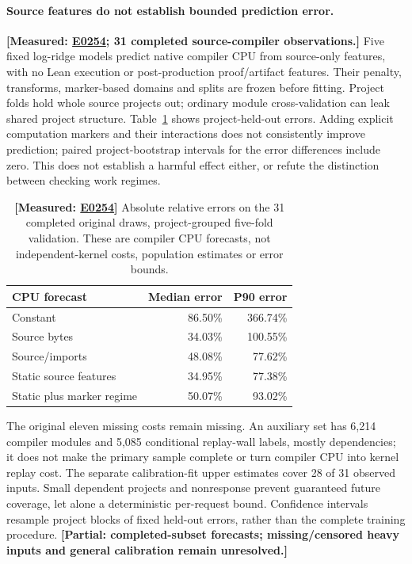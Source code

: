 \documentclass[10pt,twocolumn]{article}
\newcommand{\measured}[1]{\textbf{[Measured: #1]}}
\newcommand{\partialev}[1]{\textbf{[Partial: #1]}}
\newcommand{\expref}[2]{\href{https://github.com/yunwei37/proofserve/blob/main/docs/tmp/build-and-evaluate/step-#1/step-report.md}{E#2}}
\begin{document}
\paragraph{Source features do not establish bounded prediction error.}
\measured{\expref{0254-20261101T195608+0000}{0254}; 31 completed source-compiler observations.}
Five fixed log-ridge models predict native compiler CPU from source-only
features, with no Lean execution or post-production proof/artifact features.
Their penalty, transforms, marker-based domains and splits are frozen before
fitting. Project folds hold whole source projects out; ordinary module
cross-validation can leak shared project structure.
Table~\ref{tab:prediction} shows project-held-out errors.
Adding explicit computation markers and their interactions does not
consistently improve prediction; paired project-bootstrap intervals for the
error differences include zero. This does not establish a harmful effect
either, or refute the distinction between checking work regimes.

\begin{table}[t]
\centering\small
\begin{tabular}{lrr}
\toprule
CPU forecast & Median error & P90 error\\
\midrule
Constant &86.50\%&366.74\%\\
Source bytes &34.03\%&100.55\%\\
Source/imports &48.08\%&77.62\%\\
Static source features &34.95\%&77.38\%\\
Static plus marker regime &50.07\%&93.02\%\\
\bottomrule
\end{tabular}
\caption{\measured{\expref{0254-20261101T195608+0000}{0254}} Absolute relative errors on the 31 completed
original draws, project-grouped five-fold validation. These are compiler CPU
forecasts, not independent-kernel costs, population estimates or error bounds.}
\label{tab:prediction}
\end{table}

The original eleven missing costs remain missing.
An auxiliary set has 6,214 compiler modules and 5,085 conditional replay-wall
labels, mostly dependencies; it does not make the primary sample complete
or turn compiler CPU into kernel replay cost.
The separate calibration-fit upper estimates cover 28 of 31 observed inputs.
Small dependent projects and nonresponse prevent guaranteed future coverage,
let alone a deterministic per-request bound.
Confidence intervals resample project blocks of fixed held-out errors,
rather than the complete training procedure.
\partialev{completed-subset forecasts; missing/censored heavy inputs and
general calibration remain unresolved.}
\end{document}

